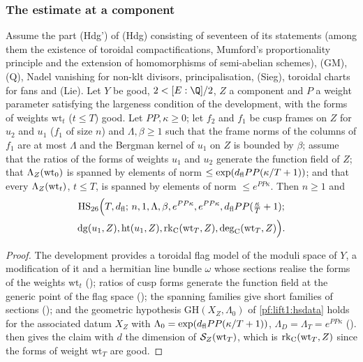 \subsubsection*{The estimate at a component}

\begin{proposition}\label{pf:lift1:hslevel}
Assume the part (Hdg') of (Hdg) consisting of seventeen of its statements (among them the existence of
toroidal compactifications, Mumford's proportionality principle and the extension of homomorphisms of
semi-abelian schemes), (GM), (Q), Nadel vanishing for non-klt divisors, principalisation, (Sieg),
toroidal charts for fans and (Lie). Let $Y$ be good, $2<[E:\Q]/2$, $Z$ a component and $P$ a weight
parameter satisfying the largeness condition of the development, with the forms of weights
$\mathrm{wt}_t$ ($t\le T$) good.
Let $PP,\kappa\ge0$; let $f_2$ and $f_1$ be cusp frames on $Z$ for $u_2$ and $u_1$ ($f_1$ of size $n$) and
$\Lambda,\beta\ge1$ such that the frame norms of the columns of $f_1$ are at most $\Lambda$ and the
Bergman kernel of $u_1$ on $Z$ is bounded by $\beta$; assume that the ratios of the forms of weights
$u_1$ and $u_2$ generate the function field of $Z$; that $\Lambda_Z(\mathrm{wt}_0)$ is spanned by
elements of norm $\le\exp(d_{\mathrm{fl}} PP(\kappa/T+1))$; and that every $\Lambda_Z(\mathrm{wt}_t)$, $t\le T$,
is spanned by elements of norm $\le e^{PP\kappa}$. Then $n\ge1$ and
\begin{multline*}
\mathrm{HS}_{26}\Bigl(T,d_{\mathrm{fl}};\,n,1,\Lambda,\beta,e^{PP\kappa},e^{PP\kappa},d_{\mathrm{fl}} PP(\tfrac\kappa T+1);\\
\mathrm{dg}(u_1,Z),\mathrm{ht}(u_1,Z),\mathrm{rk}_{\mathrm{C}}(\mathrm{wt}_T,Z),\mathrm{deg}_{\mathrm{C}}(\mathrm{wt}_T,Z)\Bigr).
\end{multline*}
\end{proposition}

\begin{proof}
The development provides a toroidal flag model of the moduli space of $Y$, a modification of it and a
hermitian line bundle $\omega$ whose sections realise the forms of the weights $\mathrm{wt}_t$
(); ratios of cusp forms generate the
function field at the generic point of the flag space
(); the spanning families
give short families of sections (); and the
geometric hypothesis $\mathrm{GH}(X_Z,\Lambda_0)$ of \cref{pf:lift1:hsdata} holds for the associated datum
$X_Z$ with $\Lambda_0=\exp(d_{\mathrm{fl}} PP(\kappa/T+1))$, $\Lambda_D=\Lambda_T=e^{PP\kappa}$
().  then gives
the claim with $d$ the dimension of $\mathcal S_Z(\mathrm{wt}_T)$, which is $\mathrm{rk}_{\mathrm{C}}(\mathrm{wt}_T,Z)$ since
the forms of weight $\mathrm{wt}_T$ are good.
\end{proof}

